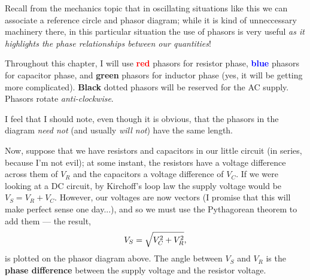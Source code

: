 \documentclass[a4paper]{amsbook}
\newcommand{\expphasordeg}[4]%
{   \path (#1);
  \pgfgetlastxy{\xorig}{\yorig}
  \pgfmathsetmacro{\xfirst}{\xorig/28.453}
  \pgfmathsetmacro{\yfirst}{\yorig/28.453}
  \pgfmathsetmacro{\xsecond}{\xorig/28.453+#2*cos(#3)}
  \pgfmathsetmacro{\ysecond}{\yorig/28.453+#2*sin(#3)}
  \draw[#4] (\xfirst,\yfirst) -- (\xsecond,\ysecond);
}
\theoremstyle{definition}
\numberwithin{exercise}{chapter}
\numberwithin{exercise}{chapter}
\begin{document}
Recall from the mechanics topic that in oscillating situations like this we can associate a reference circle and phasor diagram; while it
is kind of unneccessary machinery there, in this particular situation the use of phasors is very useful \emph{as it highlights the phase
relationships between our quantities}!

Throughout this chapter, I will use \textbf{\textcolor{red}{red}} phasors for resistor phase, \textbf{\textcolor{blue}{blue}} phasors
for capacitor phase, and \textbf{\textcolor{OliveGreen}{green}} phasors for inductor phase (yes, it will be getting more complicated). \textbf{Black}
dotted phasors will be reserved for the AC supply. Phasors rotate \emph{anti-clockwise}.

\begin{center}
\end{center}

I feel that I should note, even though it is obvious, that the phasors in the diagram \emph{need not} (and usually \emph{will not}) have
the same length.

Now, suppose that we have resistors and capacitors in our little circuit (in series, because I'm not evil); at some instant, the resistors have a
voltage difference across them of $ V_R $ and the capacitors a voltage difference of $ V_C $. If we were looking at a DC circuit, by Kirchoff's loop
law the supply voltage would be $ V_S = V_R + V_C $. However, our voltages are now vectors (I promise that this will make perfect sense one day...),
and so we must use the Pythagorean theorem to add them --- the result,
\begin{equation}
  V_S = \sqrt{\mathstrut V_C^2 + V_R^2},
\end{equation}
is plotted on the phasor diagram above. The angle between $ V_S $ and $ V_R $ is the \textbf{phase difference} between the supply voltage
and the resistor voltage.
\end{document}
